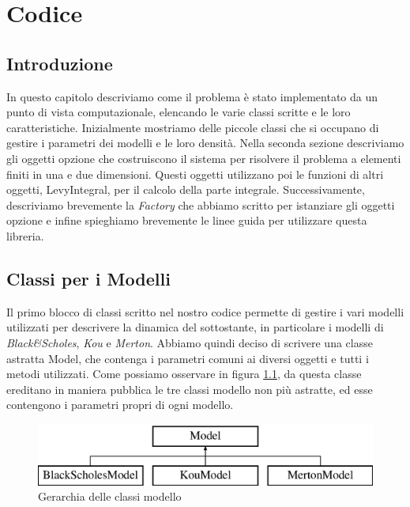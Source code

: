 \documentclass[a4paper,10pt]{report}
\theoremstyle{plain}
\theoremstyle{definition}
\theoremstyle{remark}
\begin{document}
\chapter{Codice}
\section{Introduzione}
In questo capitolo descriviamo come il problema \`e stato implementato da un punto di vista computazionale, elencando le varie classi scritte e le loro caratteristiche. Inizialmente mostriamo delle piccole classi che si occupano di gestire i parametri dei modelli e le loro densit\`a. Nella seconda sezione descriviamo gli oggetti opzione che costruiscono il sistema per risolvere il problema a elementi finiti in una e due dimensioni. Questi oggetti utilizzano poi le funzioni di altri oggetti, \textsf{LevyIntegral}, per il calcolo della parte integrale. Successivamente, descriviamo brevemente la \emph{Factory} che abbiamo scritto per istanziare gli oggetti opzione e infine spieghiamo brevemente le linee guida per utilizzare questa libreria.
\section{Classi per i Modelli}
Il primo blocco di classi scritto nel nostro codice permette di gestire i vari modelli utilizzati per descrivere la dinamica del sottostante, in particolare i modelli di \emph{Black\&Scholes}, \emph{Kou} e \emph{Merton}. Abbiamo quindi deciso di scrivere una classe astratta \textsf{Model}, che contenga i parametri comuni ai diversi oggetti e tutti i metodi utilizzati. Come possiamo osservare in figura \ref{model-base}, da questa classe ereditano in maniera pubblica le tre classi modello non pi\`u astratte, ed esse contengono i parametri propri di ogni modello.
\begin{figure}[h!]
\begin{center}
\includegraphics[width=12cm]{img/classModel.eps}
\caption{Gerarchia delle classi modello}
\label{model-base}
\end{center}
\end{figure}
\end{document}
